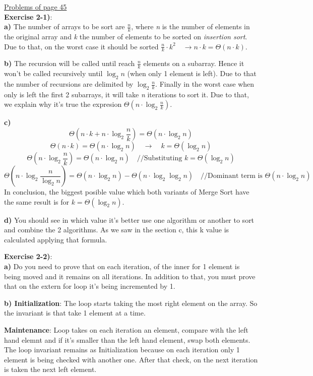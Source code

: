 \documentclass{article}
\newcounter{exercise}[section]   %
\begin{document}
\underline{\large{Problems of page 45}}
\\
\textbf{Exercise 2-1)}:\\
\textbf{a)} The number of arrays to be sort are \(\frac{n}{k}\), where \textit{n} is the
number of elements in the original array and \textit{k} the number of elements to be sorted on
\textit{insertion sort}. Due to that, on the worst case it should be sorted \(\frac{n}{k}
\cdot k^2 \quad \rightarrow n \cdot k = \Theta(n \cdot k)\).

\textbf{b)} The recursion will be called until reach \(\frac{n}{k}\) elements on a subarray.
Hence it won't be called recursively until \(\log_2 n\) (when only 1 element is left). 
Due to that the number of recursions are delimited by \(\log_2 \frac{n}{k}\). Finally in the
worst case when only is left the first 2 subarrays, it will take \textit{n} iterations to
sort it. Due to that, we explain why it's true the expresion \(\Theta(n \cdot \log_2 \frac{n}{k})\).

\textbf{c)}  
\[
\Theta\left(n \cdot k + n \cdot \log_2 \frac{n}{k}\right) = \Theta(n \cdot \log_2 n)
\]
\[
\Theta(n \cdot k) = \Theta(n \cdot \log_2 n) \quad \rightarrow \quad k = \Theta(\log_2 n)
\]
\[
\Theta\left(n \cdot \log_2 \frac{n}{k}\right) = \Theta(n \cdot \log_2 n) \quad 
\text{//Substituting } k = \Theta(\log_2 n)
\]
\[
\Theta\left(n \cdot \log_2 \frac{n}{\log_2 n}\right) = \Theta(n \cdot \log_2 n) - \Theta(n \cdot \log_2 \log_2 n)
\quad \text{//Dominant term is  \(\Theta(n \cdot \log_2 n)\)}
\]
In conclusion, the biggest posible value which both variants of Merge Sort have the same result
is for \(k = \Theta(\log_2 n)\).

\textbf{d)}
You should see in which value it's better use one algorithm or another to sort and combine
the 2 algorithms. As we saw in the section c, this k value is calculated applying that formula.

\textbf{Exercise 2-2)}:\\
\textbf{a)} Do you need to prove that on each iteration, of the inner for 1 element is being
moved and it remains on all iterations. In addition to that, you must prove that on the extern
for loop it's being incremented by 1.

\textbf{b) Initialization}: The loop starts taking the most right element on the array.
So the invariant is that take 1 element at a time.

\textbf{Maintenance}: Loop takes on each iteration an element, compare with the left hand
elemnt and if it's smaller than the left hand element, swap both elements. The loop invariant
remains as Initialization because on each iteration only 1 element is being checked with
another one. After that check, on the next iteration is taken the next left element.
\end{document}
